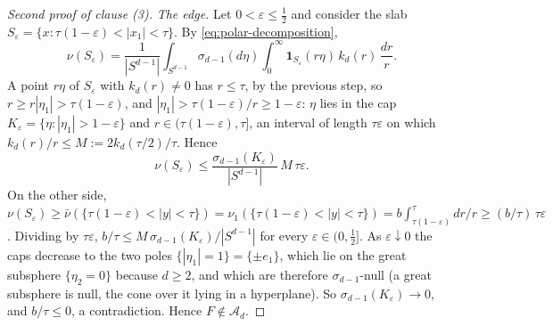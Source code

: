\begin{proof}[Second proof of clause (3)]
\emph{The edge.} Let $0 < \varepsilon \le \tfrac12$ and consider the slab
$S_\varepsilon = \{x : \tau(1-\varepsilon) < |x_1| < \tau\}$. By \ref{eq:polar-decomposition},
\[
  \nu(S_\varepsilon) = \frac{1}{|S^{d-1}|}\int_{S^{d-1}}\sigma_{d-1}(d\eta)\int_0^\infty
    \mathbf 1_{S_\varepsilon}(r\eta)\,k_d(r)\,\frac{dr}{r} .
\]
A point $r\eta$ of $S_\varepsilon$ with $k_d(r) \ne 0$ has $r \le \tau$, by the previous step, so
$r \ge r|\eta_1| > \tau(1-\varepsilon)$, and $|\eta_1| > \tau(1-\varepsilon)/r \ge 1-\varepsilon$:
$\eta$ lies in the cap $K_\varepsilon = \{\eta : |\eta_1| > 1-\varepsilon\}$ and
$r \in (\tau(1-\varepsilon), \tau]$, an interval of length $\tau\varepsilon$ on which
$k_d(r)/r \le M := 2k_d(\tau/2)/\tau$. Hence
\[
  \nu(S_\varepsilon) \le \frac{\sigma_{d-1}(K_\varepsilon)}{|S^{d-1}|}\,M\,\tau\varepsilon .
\]
On the other side, $\nu(S_\varepsilon) \ge \bar\nu(\{\tau(1-\varepsilon) < |y| < \tau\}) =
\nu_1(\{\tau(1-\varepsilon) < |y| < \tau\}) = b\int_{\tau(1-\varepsilon)}^\tau dr/r \ge
(b/\tau)\,\tau\varepsilon$. Dividing by $\tau\varepsilon$,
$b/\tau \le M\,\sigma_{d-1}(K_\varepsilon)/|S^{d-1}|$ for every $\varepsilon \in (0,\tfrac12]$.
As $\varepsilon \downarrow 0$ the caps decrease to the two poles $\{|\eta_1| = 1\} = \{\pm e_1\}$,
which lie on the great subsphere $\{\eta_2 = 0\}$ because $d \ge 2$, and which are therefore
$\sigma_{d-1}$-null (a great subsphere is null, the cone over it lying in a hyperplane). So $\sigma_{d-1}(K_\varepsilon) \to 0$, and $b/\tau \le 0$, a contradiction.
Hence $F \notin \mathcal{A}_d$.
\end{proof}

